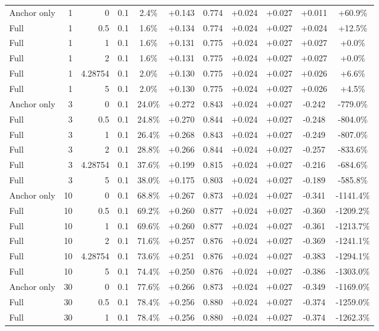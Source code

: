 \begin{table}[htbp]
\begin{tabular}{lrrrccccccc}
Anchor only & 1 & 0 & 0.1 & 2.4\% & +0.143 & 0.774 & +0.024 & +0.027 & +0.011 & +60.9\% \\
Full & 1 & 0.5 & 0.1 & 1.6\% & +0.134 & 0.774 & +0.024 & +0.027 & +0.024 & +12.5\% \\
Full & 1 & 1 & 0.1 & 1.6\% & +0.131 & 0.775 & +0.024 & +0.027 & +0.027 & +0.0\% \\
Full & 1 & 2 & 0.1 & 1.6\% & +0.131 & 0.775 & +0.024 & +0.027 & +0.027 & +0.0\% \\
Full & 1 & 4.28754 & 0.1 & 2.0\% & +0.130 & 0.775 & +0.024 & +0.027 & +0.026 & +6.6\% \\
Full & 1 & 5 & 0.1 & 2.0\% & +0.130 & 0.775 & +0.024 & +0.027 & +0.026 & +4.5\% \\
Anchor only & 3 & 0 & 0.1 & 24.0\% & +0.272 & 0.843 & +0.024 & +0.027 & -0.242 & -779.0\% \\
Full & 3 & 0.5 & 0.1 & 24.8\% & +0.270 & 0.844 & +0.024 & +0.027 & -0.248 & -804.0\% \\
Full & 3 & 1 & 0.1 & 26.4\% & +0.268 & 0.843 & +0.024 & +0.027 & -0.249 & -807.0\% \\
Full & 3 & 2 & 0.1 & 28.8\% & +0.266 & 0.844 & +0.024 & +0.027 & -0.257 & -833.6\% \\
Full & 3 & 4.28754 & 0.1 & 37.6\% & +0.199 & 0.815 & +0.024 & +0.027 & -0.216 & -684.6\% \\
Full & 3 & 5 & 0.1 & 38.0\% & +0.175 & 0.803 & +0.024 & +0.027 & -0.189 & -585.8\% \\
Anchor only & 10 & 0 & 0.1 & 68.8\% & +0.267 & 0.873 & +0.024 & +0.027 & -0.341 & -1141.4\% \\
Full & 10 & 0.5 & 0.1 & 69.2\% & +0.260 & 0.877 & +0.024 & +0.027 & -0.360 & -1209.2\% \\
Full & 10 & 1 & 0.1 & 69.6\% & +0.260 & 0.877 & +0.024 & +0.027 & -0.361 & -1213.7\% \\
Full & 10 & 2 & 0.1 & 71.6\% & +0.257 & 0.876 & +0.024 & +0.027 & -0.369 & -1241.1\% \\
Full & 10 & 4.28754 & 0.1 & 73.6\% & +0.251 & 0.876 & +0.024 & +0.027 & -0.383 & -1294.1\% \\
Full & 10 & 5 & 0.1 & 74.4\% & +0.250 & 0.876 & +0.024 & +0.027 & -0.386 & -1303.0\% \\
Anchor only & 30 & 0 & 0.1 & 77.6\% & +0.266 & 0.873 & +0.024 & +0.027 & -0.349 & -1169.0\% \\
Full & 30 & 0.5 & 0.1 & 78.4\% & +0.256 & 0.880 & +0.024 & +0.027 & -0.374 & -1259.0\% \\
Full & 30 & 1 & 0.1 & 78.4\% & +0.256 & 0.880 & +0.024 & +0.027 & -0.374 & -1262.3\% \\

\end{tabular}
\end{table}
